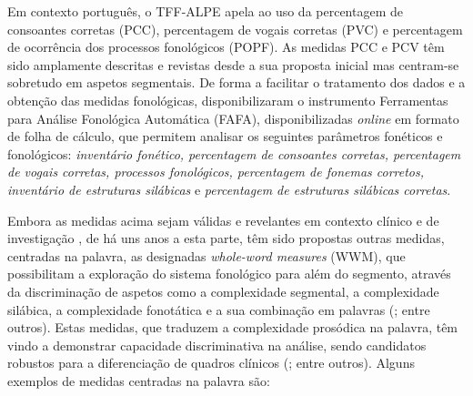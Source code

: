 \documentclass[output=paper,colorlinks,citecolor=brown,booklanguage=portuguese]{langscibook}
\begin{document}
Em contexto português, o TFF-ALPE apela ao uso da percentagem de consoantes corretas (PCC), percentagem de vogais corretas (PVC) e percentagem de ocorrência dos processos fonológicos (POPF). As medidas PCC e PCV têm sido amplamente descritas e revistas desde a sua proposta inicial \citep{Shriberg1982a} mas centram-se sobretudo em aspetos segmentais. De forma a facilitar o tratamento dos dados e a obtenção das medidas fonológicas, \citet{Jesus2013} disponibilizaram o instrumento Ferramentas para Análise Fonológica Automática (FAFA), disponibilizadas \emph{online} em formato de folha de cálculo, que permitem analisar os seguintes parâmetros fonéticos e fonológicos: \emph{inventário fonético, percentagem de consoantes corretas, percentagem de vogais corretas, processos fonológicos, percentagem de fonemas corretos, inventário de estruturas silábicas} e \emph{percentagem de estruturas silábicas corretas}.

Embora as medidas acima sejam válidas e revelantes em contexto clínico e de investigação \citep{Saraiva2017}, de há uns anos a esta parte, têm sido propostas outras medidas, centradas na palavra, as designadas \emph{whole-word measures} (WWM), que possibilitam a exploração do sistema fonológico para além do segmento, através da discriminação de aspetos como a complexidade segmental, a complexidade silábica, a complexidade fonotática e a sua combinação em palavras (\citealp{Ingram2002, StoelGammon2010, Arias2013, Mason2015}; entre outros). Estas medidas, que traduzem a complexidade prosódica na palavra, têm vindo a demonstrar capacidade discriminativa na análise, sendo candidatos robustos para a diferenciação de quadros clínicos (\citealp{Ramalho2017a, Bernhardt2020}; entre outros). Alguns exemplos de medidas centradas na palavra são: 
\end{document}
